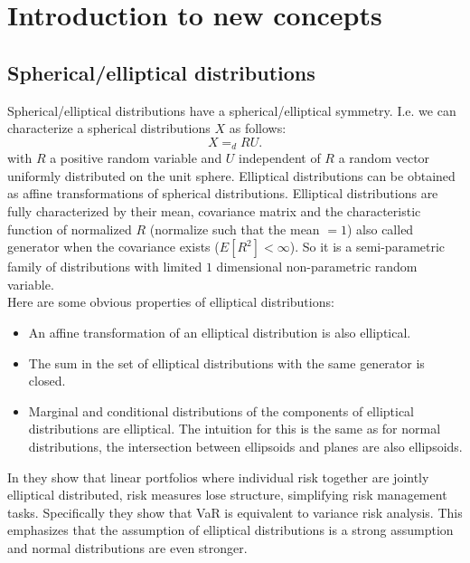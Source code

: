 \documentclass[a4paper,12pt]{article}
\begin{document}
\section{Introduction to new concepts}

\subsection{Spherical/elliptical distributions}
Spherical/elliptical distributions have a spherical/elliptical symmetry. I.e.
we can characterize a spherical distributions $X$ as follows:
\begin{equation}
    X =_{d} R U
    .
\end{equation}
with $R$ a positive random variable and $U$ independent of $R$ a random vector uniformly distributed on the unit sphere.
Elliptical distributions can be obtained as affine transformations of spherical distributions. Elliptical distributions
are fully characterized by their mean, covariance matrix and the characteristic function of normalized $R$
(normalize such that the mean $=1$) also called generator when the covariance exists ($E[R^{2}]<\infty$).
So it is a semi-parametric family of distributions with
limited $1$ dimensional non-parametric random variable.  \\

Here are some obvious properties of elliptical distributions:
\begin{itemize}
    \item An affine transformation of an elliptical distribution is also elliptical.
    \item The sum in the set of elliptical distributions with the same generator is closed.
    \item Marginal and conditional  distributions of the components of elliptical distributions are elliptical. The intuition
          for this is the same as for normal distributions, the intersection between ellipsoids and planes are also ellipsoids.
\end{itemize}

In \cite{dempster_correlation_2002} they show that linear portfolios where individual risk together are jointly elliptical
distributed, risk measures lose structure, simplifying risk management tasks. Specifically they show that VaR is equivalent
to variance risk analysis. This emphasizes that the assumption of elliptical distributions is a strong assumption and
normal distributions are even stronger.
\end{document}
